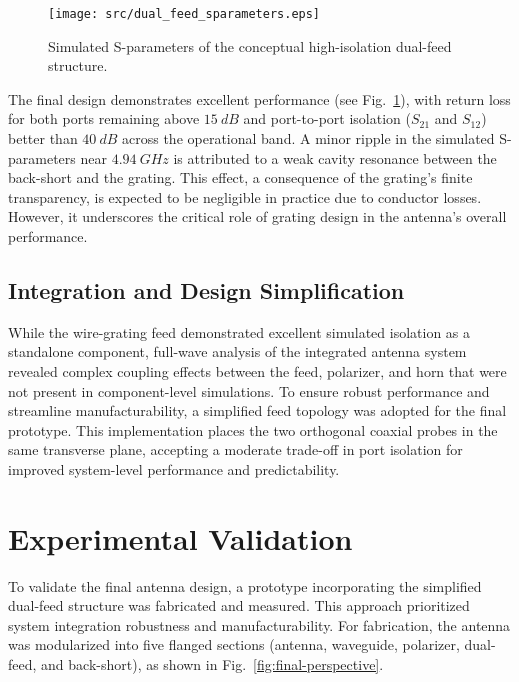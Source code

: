 \documentclass[journal]{IEEEtran}
\begin{document}
\begin{figure}[!b]
    \centering
    \texttt{[image: src/dual\_feed\_sparameters.eps]}
    \caption{\label{fig:dual-feed-sparameters}Simulated S-parameters of the conceptual high-isolation dual-feed structure.}
\end{figure}

The final design demonstrates excellent performance (see Fig.~\ref{fig:dual-feed-sparameters}), with return loss for both ports remaining above $\qty{15}{dB}$ and port-to-port isolation ($S_{21}$ and $S_{12}$) better than $\qty{40}{dB}$ across the operational band. A minor ripple in the simulated S-parameters near $\qty{4.94}{GHz}$ is attributed to a weak cavity resonance between the back-short and the grating. This effect, a consequence of the grating's finite transparency, is expected to be negligible in practice due to conductor losses. However, it underscores the critical role of grating design in the antenna's overall performance.

\subsection{Integration and Design Simplification}

While the wire-grating feed demonstrated excellent simulated isolation as a standalone component, full-wave analysis of the integrated antenna system revealed complex coupling effects between the feed, polarizer, and horn that were not present in component-level simulations. To ensure robust performance and streamline manufacturability, a simplified feed topology was adopted for the final prototype. This implementation places the two orthogonal coaxial probes in the same transverse plane, accepting a moderate trade-off in port isolation for improved system-level performance and predictability.


\section{Experimental Validation}
\label{sec:experimental-validation}

To validate the final antenna design, a prototype incorporating the simplified dual-feed structure was fabricated and measured. This approach prioritized system integration robustness and manufacturability. For fabrication, the antenna was modularized into five flanged sections (antenna, waveguide, polarizer, dual-feed, and back-short), as shown in Fig.~\ref{fig:final-perspective}.
\end{document}
